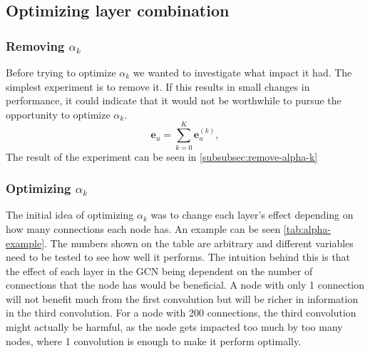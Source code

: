 \subsection{Optimizing layer combination}
\subsubsection{Removing $\alpha_k$}
Before trying to optimize $\alpha_k$ we wanted to investigate what impact it had.
The simplest experiment is to remove it.
If this results in small changes in performance, it could indicate that it would not be worthwhile to pursue the opportunity to optimize $\alpha_k$.
\begin{equation}
    \mathbf{e}_u = \sum_{k=0}^{K} \mathbf{e}_u^{(k)},
    \label{eq:lightgcn-sum}
\end{equation}
The result of the experiment can be seen in \autoref{subsubsec:remove-alpha-k}

\subsubsection{Optimizing $\alpha_k$}
The initial idea of optimizing $\alpha_k$ was to change each layer's effect depending on how many connections each node has.
An example can be seen \autoref{tab:alpha-example}.
The numbers shown on the table are arbitrary and different variables need to be tested to see how well it performs.
The intuition behind this is that the effect of each layer in the GCN being dependent on the number of connections that the node has would be beneficial.
A node with only 1 connection will not benefit much from the first convolution but will be richer in information in the third convolution.
For a node with 200 connections, the third convolution might actually be harmful, as the node gets impacted too much by too many nodes, where 1 convolution is enough to make it perform optimally.

